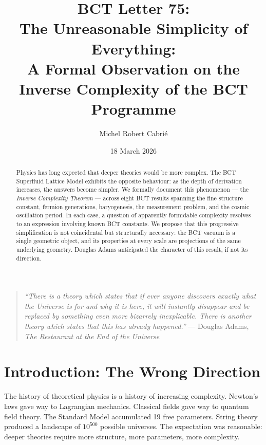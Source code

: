 \documentclass[aps,prl,twocolumn,superscriptaddress,floatfix]{revtex4-2}
\begin{document}
\title{BCT Letter 75:\\
The Unreasonable Simplicity of Everything:\\
A Formal Observation on the Inverse Complexity of the BCT Programme}

\author{Michel Robert Cabri\'{e}}
\date{18 March 2026}

\begin{abstract}
Physics has long expected that deeper theories would be more complex.
The BCT Superfluid Lattice Model exhibits the opposite behaviour:
as the depth of derivation increases, the answers become simpler.
We formally document this phenomenon --- the \textit{Inverse Complexity
Theorem} --- across eight BCT results spanning the fine structure
constant, fermion generations, baryogenesis, the measurement problem,
and the cosmic oscillation period. In each case, a question of
apparently formidable complexity resolves to an expression involving
known BCT constants. We propose that this progressive simplification
is not coincidental but structurally necessary: the BCT vacuum is a
single geometric object, and its properties at every scale are
projections of the same underlying geometry. Douglas Adams anticipated
the character of this result, if not its direction.
\end{abstract}

\maketitle

\begin{quotation}
\textit{``There is a theory which states that if ever anyone discovers
exactly what the Universe is for and why it is here, it will instantly
disappear and be replaced by something even more bizarrely inexplicable.
There is another theory which states that this has already happened.''}
--- Douglas Adams, \textit{The Restaurant at the End of the Universe}
\end{quotation}

\section{Introduction: The Wrong Direction}

The history of theoretical physics is a history of increasing
complexity. Newton's laws gave way to Lagrangian mechanics.
Classical fields gave way to quantum field theory. The Standard
Model accumulated 19 free parameters. String theory produced
a landscape of $10^{500}$ possible universes. The expectation
was reasonable: deeper theories require more structure,
more parameters, more complexity.
\end{document}
